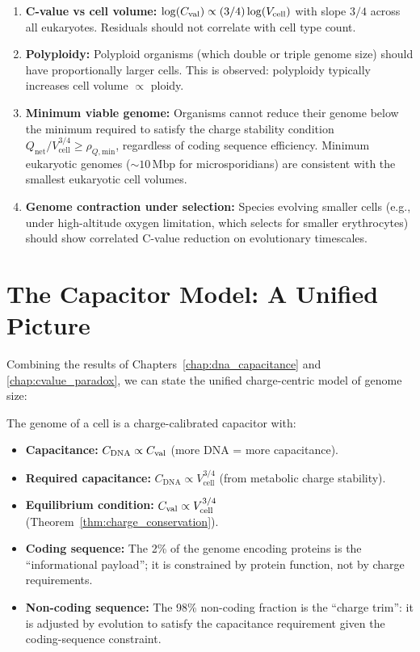 \begin{enumerate}[label=(\roman*)]
  \item \textbf{C-value vs cell volume:} $\log(C_{\mathrm{val}}) \propto (3/4)\log(V_{\mathrm{cell}})$
    with slope $3/4$ across all eukaryotes. Residuals should not
    correlate with cell type count.
  \item \textbf{Polyploidy:} Polyploid organisms (which double or triple
    genome size) should have proportionally larger cells. This is
    observed: polyploidy typically increases cell volume $\propto$ ploidy.
  \item \textbf{Minimum viable genome:} Organisms cannot reduce their genome
    below the minimum required to satisfy the charge stability condition
    $Q_{\mathrm{net}} / V_{\mathrm{cell}}^{3/4} \geq \rho_{Q,\mathrm{min}}$,
    regardless of coding sequence efficiency. Minimum eukaryotic genomes
    ($\sim 10\,\mathrm{Mbp}$ for microsporidians) are consistent with
    the smallest eukaryotic cell volumes.
  \item \textbf{Genome contraction under selection:} Species evolving
    smaller cells (e.g., under high-altitude oxygen limitation, which
    selects for smaller erythrocytes) should show correlated C-value
    reduction on evolutionary timescales.
\end{enumerate}

\section{The Capacitor Model: A Unified Picture}
\label{sec:unified_picture}

Combining the results of Chapters~\ref{chap:dna_capacitance} and
\ref{chap:cvalue_paradox}, we can state the unified charge-centric
model of genome size:

\begin{definition}
\label{def:genome_capacitor}
The genome of a cell is a charge-calibrated capacitor with:
\begin{itemize}
  \item \textbf{Capacitance:} $C_{\mathrm{DNA}} \propto C_{\mathrm{val}}$ (more DNA = more capacitance).
  \item \textbf{Required capacitance:} $C_{\mathrm{DNA}} \propto V_{\mathrm{cell}}^{3/4}$
    (from metabolic charge stability).
  \item \textbf{Equilibrium condition:} $C_{\mathrm{val}} \propto V_{\mathrm{cell}}^{3/4}$
    (Theorem~\ref{thm:charge_conservation}).
  \item \textbf{Coding sequence:} The 2\% of the genome encoding proteins
    is the ``informational payload''; it is constrained by protein function,
    not by charge requirements.
  \item \textbf{Non-coding sequence:} The 98\% non-coding fraction is the
    ``charge trim'': it is adjusted by evolution to satisfy the capacitance
    requirement given the coding-sequence constraint.
\end{itemize}
\end{definition}

